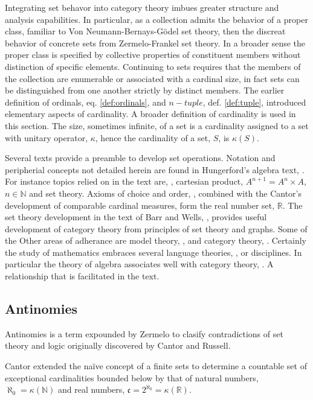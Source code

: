 \documentclass[aps,twocolumn,secnumarabic,nobalancelastpage,amsmath,amssymb,
amsthm,nofootinbib,parskip=full]{revtex4}
\numberwithin{equation}{section}
\newcommand{\scard}[1]{\kappa(#1)}
\begin{document}
Integrating set behavor into category theory imbues
greater structure and analysis capabilities.
In particular, as a collection admits the behavior of a proper class,
familiar to Von Neumann-Bernays-G\"{o}del set theory,
then the discreat behavior of concrete sets from
Zermelo-Frankel set theory.
In a broader sense the proper class is specified
by collective properties of constituent members without
distinction of specific elements. Continuing to sets
requires that the members of the collection are
enumerable or associated with a cardinal size, in fact
sets can be distinguished from one another strictly by
distinct members. The earlier definition of ordinals,
eq. \ref{def:ordinals}, and $n-tuple$, def. \ref{def:tuple},
introduced elementary aspects of cardinality.
A broader definition of cardinality is used in this
section. The size, sometimes infinite,
of a set is a cardinality
assigned to a set with unitary operator, $\kappa$,
hence the cardinality of a set, $S$, is $\scard{S}$.

Several texts provide a preamble to develop
set operations. Notation and peripherial concepts
not detailed herein are found in
Hungerford's algebra text, \cite{hungerford1974}.
For instance topics relied on in the text are,
\cite{hungerford1974}, cartesian product,
$A^{n+1}=A^n\times A$, $n\in\mathbb{N}$
and set theory.
Axioms of choice and order, \cite{hungerford1974},
combined with the Cantor's development of
comparable cardinal measures, form the real number set,
$\mathbb{R}$. The set theory development in
the text of Barr and Wells, \cite{barrwells1990}, provides
useful development of category theory
from principles of set theory and graphs.
Some of the Other areas
of adherance are model theory, \cite{hodges1993},
and category theory, \cite{awodey2010}.
Certainly the study of mathematics embraces several
language theories, \cite{hodges1993},
or disciplines. In particular
the theory of algebra associates well with
category theory, \cite{awodey2010}. A relationship that
is facilitated in the text.

\subsection{Antinomies}

Antinomies is a term expounded by Zermelo to clasify
contradictions of set theory and logic originally discovered
by Cantor and Russell.

Cantor extended the na\"{i}ve concept of a finite sets to
determine a countable set of exceptional cardinalities
bounded below by that of natural numbers, $\aleph_0=\scard{\mathbb{N}}$
and real numbers, $\mathfrak{c}=2^{\aleph_0}=\scard{\mathbb{R}}$.
\end{document}
